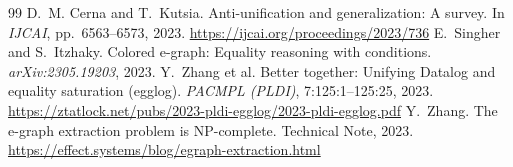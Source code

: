 \documentclass[11pt,a4paper]{article}
\begin{document}
\begin{thebibliography}{99}
 D.~M. Cerna and T.~Kutsia. Anti-unification and generalization: A survey. In \emph{IJCAI}, pp.~6563--6573, 2023. \url{https://ijcai.org/proceedings/2023/736}
 E.~Singher and S.~Itzhaky. Colored e-graph: Equality reasoning with conditions. \emph{arXiv:2305.19203}, 2023.
 Y.~Zhang et al. Better together: Unifying Datalog and equality saturation (egglog). \emph{PACMPL (PLDI)}, 7:125:1--125:25, 2023. \url{https://ztatlock.net/pubs/2023-pldi-egglog/2023-pldi-egglog.pdf}
 Y.~Zhang. The e-graph extraction problem is NP-complete. Technical Note, 2023. \url{https://effect.systems/blog/egraph-extraction.html}
\end{thebibliography}
\end{document}
